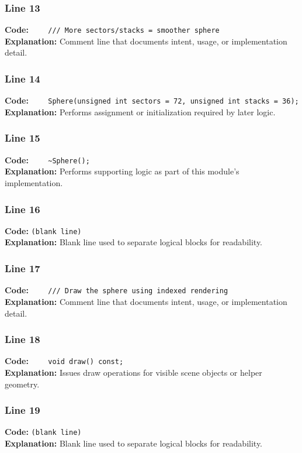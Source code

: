 \documentclass[11pt,a4paper]{article}
\begin{document}
\subsubsection*{Line 13}
\textbf{Code:} \verb|    /// More sectors/stacks = smoother sphere|\\
\textbf{Explanation:} Comment line that documents intent, usage, or implementation detail.

\subsubsection*{Line 14}
\textbf{Code:} \verb|    Sphere(unsigned int sectors = 72, unsigned int stacks = 36);|\\
\textbf{Explanation:} Performs assignment or initialization required by later logic.

\subsubsection*{Line 15}
\textbf{Code:} \verb|    ~Sphere();|\\
\textbf{Explanation:} Performs supporting logic as part of this module's implementation.

\subsubsection*{Line 16}
\textbf{Code:} \texttt{(blank line)}\\
\textbf{Explanation:} Blank line used to separate logical blocks for readability.

\subsubsection*{Line 17}
\textbf{Code:} \verb|    /// Draw the sphere using indexed rendering|\\
\textbf{Explanation:} Comment line that documents intent, usage, or implementation detail.

\subsubsection*{Line 18}
\textbf{Code:} \verb|    void draw() const;|\\
\textbf{Explanation:} Issues draw operations for visible scene objects or helper geometry.

\subsubsection*{Line 19}
\textbf{Code:} \texttt{(blank line)}\\
\textbf{Explanation:} Blank line used to separate logical blocks for readability.
\end{document}
